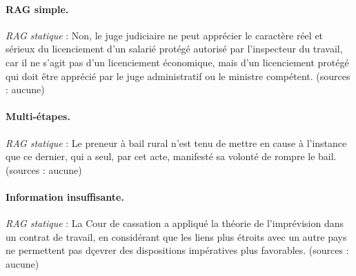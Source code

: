 \paragraph{RAG simple.} \emph{RAG statique} : Non, le juge judiciaire ne peut apprécier le caractère réel et sérieux du licenciement d'un salarié protégé autorisé par l'inspecteur du travail, car il ne s'agit pas d'un licenciement économique, mais d'un licenciement protégé qui doit être apprécié par le juge administratif ou le ministre compétent. (sources : aucune)

\paragraph{Multi-étapes.} \emph{RAG statique} : Le preneur à bail rural n'est tenu de mettre en cause à l'instance que ce dernier, qui a seul, par cet acte, manifesté sa volonté de rompre le bail. (sources : aucune)

\paragraph{Information insuffisante.} \emph{RAG statique} : La Cour de cassation a appliqué la théorie de l'imprévision dans un contrat de travail, en considérant que les liens plus étroits avec un autre pays ne permettent pas dçevrer des dispositions impératives plus favorables. (sources : aucune)
